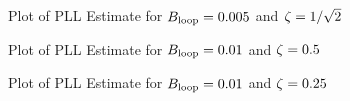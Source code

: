\documentclass{article}
\begin{document}
\begin{figure}[H]
	\centerline{}
	\caption{Plot of PLL Estimate for $\protect{B_\text{loop}} = 0.005$ and $\protect{\zeta = 1/\sqrt{2}}$}
	\label{fig::convergence_Bloop_0p005_damp_sqrt_2}
\end{figure}

\begin{figure}[H]
	\centerline{}
	\caption{Plot of PLL Estimate for $\protect{B_\text{loop}} = 0.01$ and $\protect{\zeta = 0.5}$}
	\label{fig::convergence_Bloop_0p01_damp_0p5}
\end{figure}

\begin{figure}[H]
	\centerline{}
	\caption{Plot of PLL Estimate for $\protect{B_\text{loop}} = 0.01$ and $\protect{\zeta = 0.25}$}
	\label{fig::convergence_Bloop_0p01_damp_0p25}
\end{figure}
\end{document}
